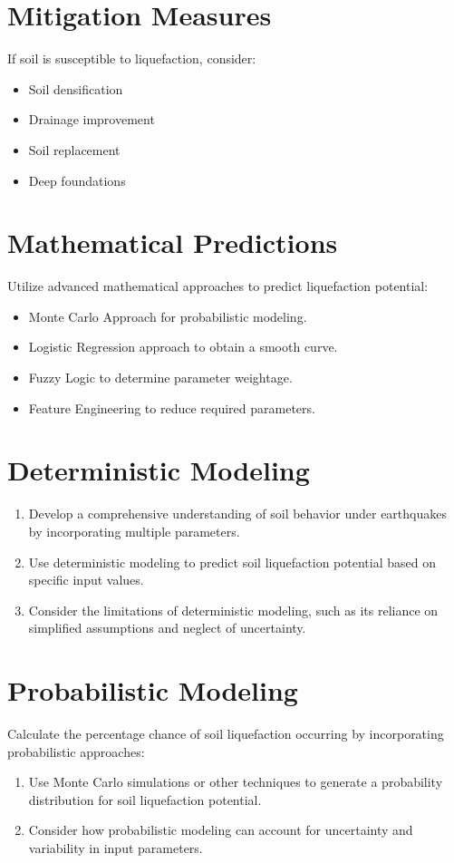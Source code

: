 \section{Mitigation Measures}
If soil is susceptible to liquefaction, consider:
\begin{itemize}
    \item Soil densification
    \item Drainage improvement
    \item Soil replacement
    \item Deep foundations
\end{itemize}

\section{Mathematical Predictions}
Utilize advanced mathematical approaches to predict liquefaction potential:
\begin{itemize}
    \item Monte Carlo Approach for probabilistic modeling.
    \item Logistic Regression approach to obtain a smooth curve.
    \item Fuzzy Logic to determine parameter weightage.
    \item Feature Engineering to reduce required parameters.
\end{itemize}

\section{Deterministic Modeling}
\begin{enumerate}
    \item Develop a comprehensive understanding of soil behavior under earthquakes by incorporating multiple parameters.
    \item Use deterministic modeling to predict soil liquefaction potential based on specific input values.
    \item Consider the limitations of deterministic modeling, such as its reliance on simplified assumptions and neglect of uncertainty.
\end{enumerate}

\section{Probabilistic Modeling}
Calculate the percentage chance of soil liquefaction occurring by incorporating probabilistic approaches:
\begin{enumerate}
    \item Use Monte Carlo simulations or other techniques to generate a probability distribution for soil liquefaction potential.
    \item Consider how probabilistic modeling can account for uncertainty and variability in input parameters.
\end{enumerate}

